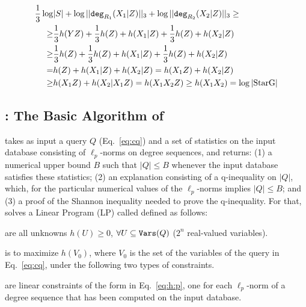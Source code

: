 \begin{align*}
  \frac{1}{3}\log & |S| + \log ||\texttt{deg}_{R_1}(X_1|Z)||_3+\log ||\texttt{deg}_{R_2}(X_2|Z)||_3\geq\\
  \geq & \frac{1}{3}h(YZ)+\frac{1}{3}h(Z)+h(X_1|Z)+\frac{1}{3}h(Z)+h(X_2|Z) \\
  \geq & \frac{1}{3}h(Z)+\frac{1}{3}h(Z)+h(X_1|Z)+\frac{1}{3}h(Z)+h(X_2|Z) \\
  = & h(Z) + h(X_1|Z)+ h(X_2|Z) = h(X_1Z) + h(X_2|Z) \\ 
  \geq & h(X_1Z) + h(X_2|X_1Z)  = h(X_1X_2Z) 
  \geq h(X_1X_2)=\log|\text{StarG}|
\end{align*}


\subsection{\lpbase: The Basic Algorithm of \system}

\label{subsec:basic:algorithm}

\system takes as input a query $Q$ (Eq.~\eqref{eq:cq}) and a set of
statistics on the input database consisting of $\ell_p$-norms on
degree sequences, and returns: (1) a numerical upper
bound $B$ such that $|Q|\leq B$ whenever the input database satisfies
these statistics; (2) an explanation consisting of a q-inequality on
$|Q|$, which, for the particular numerical values of the
$\ell_p$-norms implies $|Q| \leq B$; and (3) a proof of the Shannon
inequality needed to prove the q-inequality.
For that, \system solves a Linear Program (LP) called \lpbase defined as follows:
%

\smallskip

 are all unknowns
$h(U)\geq 0$, $\forall U \subseteq \texttt{Vars}(Q)$ ($2^n$ real-valued
variables).

\smallskip

 is to maximize $h(V_0)$, where $V_0$ is the set of    
the \groupby variables of the query in Eq.~\eqref{eq:cq}, under the
following two types of constraints.

\smallskip

 are linear constraints of
the form in Eq.~\eqref{eq:h:p}, one for each $\ell_p$-norm of a degree sequence
that has been computed on the input database.

\smallskip

